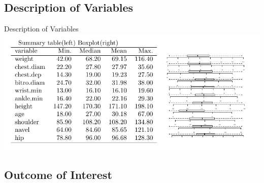 \documentclass[table]{beamer}\usepackage[]{graphicx}\usepackage[]{color}
\begin{document}

\subsection{Description of Variables}

\begin{frame}{Description of Variables}
\includegraphics[width=\textwidth]{summary_table}

\end{frame}



\subsection{Outcome of Interest}

\end{document}
